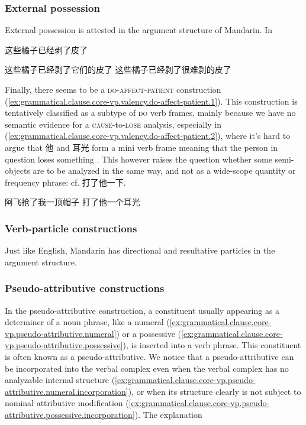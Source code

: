 \documentclass[UTF8, a4paper, oneside, scheme=plain, 12pt]{ctexrep}
\newcommand*{\category}[1]{\textsc{#1}}
\begin{document}
\subsubsection{External possession}

External possession is attested in the argument structure of Mandarin.
In 

\begin{exe}
    \ex 这些橘子已经剥了皮了
    \ex\begin{xlist}
        \ex *这些橘子已经剥了它们的皮了
        \ex *这些橘子已经剥了很难剥的皮了
    \end{xlist}
\end{exe}

Finally, there seems to be a \category{do}-\category{affect}-\category{patient} construction
(\ref{ex:grammatical.clause.core-vp.valency.do-affect-patient.1}).
This construction is tentatively classified as a subtype of \category{do} verb frames,
mainly because we have no semantic evidence for a \category{cause}-to-\category{lose} analysis,
especially in (\ref{ex:grammatical.clause.core-vp.valency.do-affect-patient.2}),
where it's hard to argue that 他 and 耳光 form a mini verb frame meaning that the person in question loses something
\citep{huang2007}.
This however raises the question whether some semi-objects are to be analyzed in the same way,
and not as a wide-scope quantity or frequency phrase: cf. 打了他一下.

\begin{exe}
    \ex\label{ex:grammatical.clause.core-vp.valency.do-affect-patient.1} 阿飞抢了我一顶帽子
    \ex\label{ex:grammatical.clause.core-vp.valency.do-affect-patient.2} 打了他一个耳光
\end{exe}

\subsubsection{Verb-particle constructions}\label{sec:grammatical.clause.core-vp.particles}

Just like English, Mandarin has directional and resultative particles in the argument structure.

\subsubsection{Pseudo-attributive constructions}\label{sec:grammatical.clause.core-vp.pseudo-attributive}

In the pseudo-attributive construction,
a constituent usually appearing as a determiner of a noun phrase, 
like a numeral (\ref{ex:grammatical.clause.core-vp.pseudo-attributive.numeral})
or a possessive (\ref{ex:grammatical.clause.core-vp.pseudo-attributive.possessive}),
is inserted into a verb phrase.
This constituent is often known as a pseudo-attributive.
We notice that a pseudo-attributive can be incorporated into the verbal complex
even when the verbal complex has no analyzable internal structure
(\ref{ex:grammatical.clause.core-vp.pseudo-attributive.numeral.incorporation}),
or when its structure clearly is not subject to nominal attributive modification
(\ref{ex:grammatical.clause.core-vp.pseudo-attributive.possessive.incorporation}).
The explanation 
\end{document}
